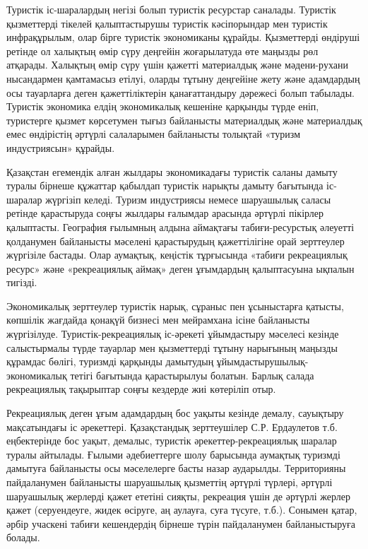Туристік іс-шаралардың негізі болып туристік ресурстар саналады.
Туристік қызметтерді тікелей қалыптастырушы туристік кәсіпорындар мен
туристік инфрақұрылым, олар бірге туристік экономиканы құрайды.
Қызметтерді өндіруші ретінде ол халықтың өмір сүру деңгейін жоғарылатуда
өте маңызды рөл атқарады. Халықтың өмір сүру үшін қажетті материалдық
және мәдени-рухани нысандармен қамтамасыз етілуі, оларды тұтыну
деңгейіне жету және адамдардың осы тауарларға деген қажеттіліктерін
қанағаттандыру дәрежесі болып табылады. Туристік экономика елдің
экономикалық кешеніне қарқынды түрде еніп, туристерге қызмет көрсетумен
тығыз байланысты материалдық және материалдық емес өндірістің әртүрлі
салаларымен байланысты толықтай «туризм индустриясын» құрайды.

Қазақстан егемендік алған жылдары экономикадағы туристік саланы дамыту
туралы бірнеше құжаттар қабылдап туристік нарықты дамыту бағытында
іс-шаралар жүргізіп келеді. Туризм индустриясы немесе шаруашылық саласы
ретінде қарастыруда соңғы жылдары ғалымдар арасында әртүрлі пікірлер
қалыптасты. География ғылымның алдына аймақтағы табиғи-ресурстық
әлеуетті қолданумен байланысты мәселені қарастырудың қажеттілігіне орай
зерттеулер жүргізіле бастады. Олар аумақтық, кеңістік тұрғысында «табиғи
рекреациялық ресурс» және «рекреациялық аймақ» деген ұғымдардың
қалыптасуына ықпалын тигізді.

Экономикалық зерттеулер туристік нарық, сұраныс пен ұсыныстарға қатысты,
көпшілік жағдайда қонақүй бизнесі мен мейрамхана ісіне байланысты
жүргізілуде. Туристік-рекреациялық іс-әрекеті ұйымдастыру мәселесі
кезінде салыстырмалы түрде тауарлар мен қызметтерді тұтыну нарығының
маңызды құрамдас бөлігі, туризмді қарқынды дамытудың
ұйымдастырушылық-экономикалық тетігі бағытында қарастырылуы болатын.
Барлық салада рекреациялық тақырыптар соңғы кездерде жиі көтеріліп отыр.

Рекреациялық деген ұғым адамдардың бос уақыты кезінде демалу, сауықтыру
мақсатындағы іс әрекеттері. Қазақстандық зерттеушілер С.Р. Ердаулетов
т.б. еңбектерінде бос уақыт, демалыс, туристік әрекеттер-рекреациялық
шаралар туралы айтылады. Ғылыми әдебиеттерге шолу барысында аумақтық
туризмді дамытуға байланысты осы мәселелерге басты назар аударылды.
Территорияны пайдаланумен байланысты шаруашылық қызметтің әртүрлі
түрлері, әртүрлі шаруашылық жерлерді қажет ететіні сияқты, рекреация
үшін де әртүрлі жерлер қажет (серуендеуге, жидек өсіруге, аң аулауға,
суға түсуге, т.б.). Сонымен қатар, әрбір учаскені табиғи кешендердің
бірнеше түрін пайдаланумен байланыстыруға болады.

